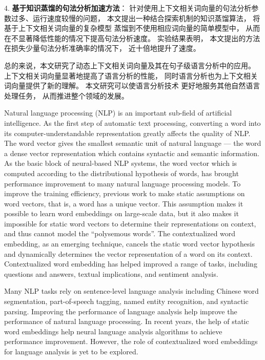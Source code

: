 \begin{cabstract}
4. \textbf{基于知识蒸馏的句法分析加速方法}：
针对使用上下文相关词向量的句法分析参数过多、运行速度较慢的问题，
本文提出一种结合探索机制的知识蒸馏算法，
将基于上下文相关词向量的复杂模型
蒸馏到不使用相应词向量的简单模型中，
从而在不显著降低性能的情况下提高句法分析速度。
实验结果表明，
本文提出的方法
在损失少量句法分析准确率的情况下，
近十倍地提升了速度。

总的来说，本文研究了动态上下文相关词向量及其在句子级语言分析中的应用。
上下文相关词向量显著地提高了语言分析的性能，
同时语言分析也为上下文相关词向量提供了新的理解。
本文研究可以使语言分析技术
更好地服务其他自然语言处理任务，
从而推进整个领域的发展。

\end{cabstract}

\begin{eabstract}

Natural language processing (NLP) is an important sub-field of artificial intelligence.
As the first step of automatic text processing, converting a word into its computer-understandable representation greatly affects the quality of NLP.
The word vector gives the smallest semantic unit of natural language --- the word a dense vector representation which contains syntactic and semantic information.
As the basic block of neural-based NLP systems,
the word vector which is computed according to the distributional hypothesis of words, has brought performance improvement to many natural language processing models.
To improve the training efficiency, previous work to make static assumptions on word vectors, that is, a word has a unique vector.
This assumption makes it possible to learn word embeddings on large-scale data, but it also makes it impossible for static word vectors to determine their representations on context, and thus cannot model the ``polysemous words''.
The contextualized word embedding, as an emerging technique, cancels the static word vector hypothesis and dynamically determines the vector representation of a word on its context.
Contextualized word embedding has helped improved a range of tasks, including questions and answers, textual implications, and sentiment analysis.

Many NLP tasks rely on sentence-level language analysis including Chinese word segmentation, part-of-speech tagging, named entity recognition, and syntactic parsing.
Improving the performance of language analysis help improve the performance of natural language processing.
In recent years, the help of static word embeddings help neural language analysis algorithms 
to achieve performance improvement.
However, the role of contextualized word embeddings for language analysis is yet to be explored.


\end{eabstract}
